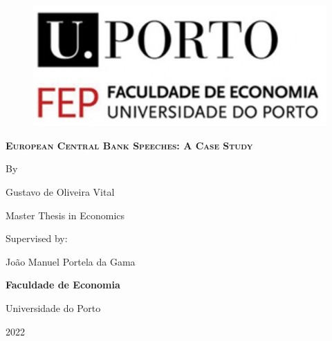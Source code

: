\date{}
\begin{titlepage}
\begin{center}

\begin{figure}[ht!]
    \centering
    \includegraphics[scale=0.5]{images/FEP.PNG}
\end{figure}

\vspace*{0.7in}
{\LARGE \textbf{ {\scshape European Central Bank Speeches: A Case Study}}}
\par
\vspace{0.4in}
{\large By}
\par
\vspace{0.4in}
{\large Gustavo de Oliveira Vital}
\par
\vspace{1in}
{\large Master Thesis in Economics}
\par
\vspace{0.8in}
\end{center}
{\large Supervised by:} \\ 
\par
{\large João Manuel Portela da Gama}
\par
\vspace{0.10in}
\vspace{1in}
\begin{center}
{\large \textbf{Faculdade de Economia}}
\par
\vspace{0.10in}
{\large Universidade do Porto}
\par
\vspace{0.2in}
{\large 2022}
\end{center}
\end{titlepage}

